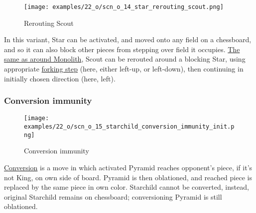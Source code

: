 \noindent
\begin{wrapfigure}[8]{l}{0.4\textwidth}
\centering
\texttt{[image: examples/22\_o/scn\_o\_14\_star\_rerouting\_scout.png]}
\caption{Rerouting Scout}
\label{fig:scn_o_14_star_rerouting_scout}
\end{wrapfigure}
In this variant, Star can be activated, and moved onto any field on a chessboard,
and so it can also block other pieces from stepping over field it occupies. \newline
\indent
\hyperref[fig:scn_d_10_monolith_rerouting_scout]{The same as around Monolith},
Scout can be rerouted around a blocking Star, using appropriate
\hyperref[fig:scn_hd_17_scout_forking_steps]{forking step} (here, either left-up,
or left-down), then continuing in initially chosen direction (here, left).

\clearpage %

\subsubsection*{Conversion immunity}
\label{sec:One/Starchild/Movement/Conversion immunity}

\vspace*{-1.4\baselineskip}
\noindent
\begin{figure}[!h]
\texttt{[image: examples/22\_o/scn\_o\_15\_starchild\_conversion\_immunity\_init.png]}
\caption{Conversion immunity}
\label{fig:scn_o_15_starchild_conversion_immunity_init}
\end{figure}

\hyperref[sec:Mayan Ascendancy/Pyramid/Conversion]{Conversion} is a move in which
activated Pyramid reaches opponent's piece, if it's not King, on own side of board.
Pyramid is then oblationed, and reached piece is replaced by the same piece in own
color. Starchild cannot be converted, instead, original Starchild remains on
chessboard; conversioning Pyramid is still oblationed.

\clearpage %

